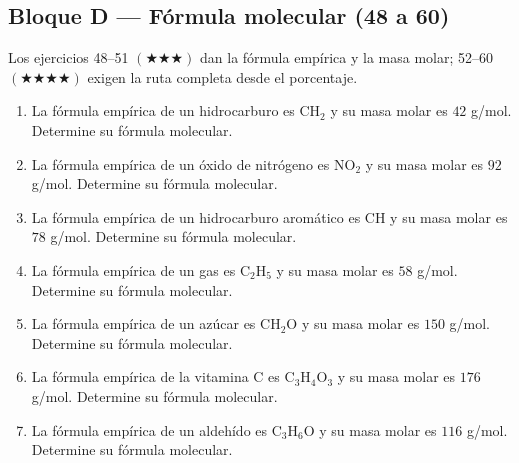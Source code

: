 \documentclass[12pt, letterpaper]{article}
\begin{document}
\subsection{Bloque D — Fórmula molecular (48 a 60)}

\noindent Los ejercicios 48--51 $(\bigstar\bigstar\bigstar)$ dan la fórmula empírica y la masa molar; 52--60 $(\bigstar\bigstar\bigstar\bigstar)$ exigen la ruta completa desde el porcentaje.

\begin{enumerate}[leftmargin=*, start=48]

  \item \dificil{}\hspace{0.55em}La fórmula empírica de un hidrocarburo es $\text{CH}_2$ y su masa molar es $42$ g/mol. Determine su fórmula molecular.

  \item \dificil{}\hspace{0.55em}La fórmula empírica de un óxido de nitrógeno es $\text{NO}_2$ y su masa molar es $92$ g/mol. Determine su fórmula molecular.

  \item \dificil{}\hspace{0.55em}La fórmula empírica de un hidrocarburo aromático es $\text{CH}$ y su masa molar es $78$ g/mol. Determine su fórmula molecular.

  \item \dificil{}\hspace{0.55em}La fórmula empírica de un gas es $\text{C}_2\text{H}_5$ y su masa molar es $58$ g/mol. Determine su fórmula molecular.

  \item \muyDificil{}\hspace{0.55em}La fórmula empírica de un azúcar es $\text{CH}_2\text{O}$ y su masa molar es $150$ g/mol. Determine su fórmula molecular.

  \item \muyDificil{}\hspace{0.55em}La fórmula empírica de la vitamina C es $\text{C}_3\text{H}_4\text{O}_3$ y su masa molar es $176$ g/mol. Determine su fórmula molecular.

  \item \muyDificil{}\hspace{0.55em}La fórmula empírica de un aldehído es $\text{C}_3\text{H}_6\text{O}$ y su masa molar es $116$ g/mol. Determine su fórmula molecular.


\end{enumerate}
\end{document}
